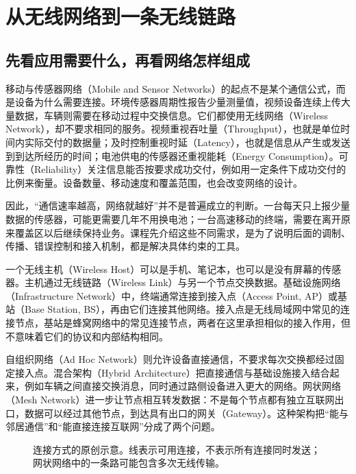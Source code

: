 \section{从无线网络到一条无线链路}
\subsection{先看应用需要什么，再看网络怎样组成}
移动与传感器网络（Mobile and Sensor Networks）的起点不是某个通信公式，而是设备为什么需要连接。环境传感器周期性报告少量测量值，视频设备连续上传大量数据，车辆则需要在移动过程中交换信息。它们都使用无线网络（Wireless Network），却不要求相同的服务。视频重视吞吐量（Throughput），也就是单位时间内实际交付的数据量；及时控制重视时延（Latency），也就是信息从产生或发送到到达所经历的时间；电池供电的传感器还重视能耗（Energy Consumption）。可靠性（Reliability）关注信息能否按要求成功交付，例如用一定条件下成功交付的比例来衡量。设备数量、移动速度和覆盖范围，也会改变网络的设计。

因此，“通信速率越高，网络就越好”并不是普遍成立的判断。一台每天只上报少量数据的传感器，可能更需要几年不用换电池；一台高速移动的终端，需要在离开原来覆盖区以后继续保持业务。课程先介绍这些不同需求，是为了说明后面的调制、传播、错误控制和接入机制，都是解决具体约束的工具。

一个无线主机（Wireless Host）可以是手机、笔记本，也可以是没有屏幕的传感器。主机通过无线链路（Wireless Link）与另一个节点交换数据。基础设施网络（Infrastructure Network）中，终端通常连接到接入点（Access Point, AP）或基站（Base Station, BS），再由它们连接其他网络。接入点是无线局域网中常见的连接节点，基站是蜂窝网络中的常见连接节点，两者在这里承担相似的接入作用，但不意味着它们的协议和内部结构相同。

自组织网络（Ad Hoc Network）则允许设备直接通信，不要求每次交换都经过固定接入点。混合架构（Hybrid Architecture）把直接通信与基础设施接入结合起来，例如车辆之间直接交换消息，同时通过路侧设备进入更大的网络。网状网络（Mesh Network）进一步让节点相互转发数据：不是每个节点都有独立互联网出口，数据可以经过其他节点，到达具有出口的网关（Gateway）。这种架构把“能与邻居通信”和“能直接连接互联网”分成了两个问题。

\begin{figure}[htbp]
\centering
{}
\caption{连接方式的原创示意。线表示可用连接，不表示所有连接同时发送；网状网络中的一条路可能包含多次无线传输。}
\end{figure}


